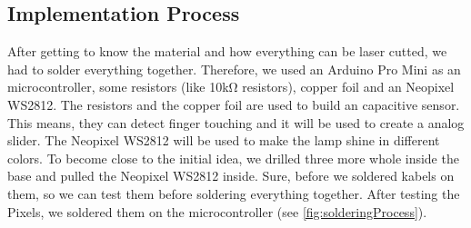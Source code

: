 \documentclass[doc.tex]{subfiles}
\begin{document}
    \subsection{Implementation Process}
        \begin{flushleft}
            After getting to know the material and how everything can be laser cutted, we had to 
            solder everything together. Therefore, we used an Arduino Pro Mini \cite{arduinoProMini} 
            as an microcontroller, some resistors (like 10k\si{\ohm} resistors), copper foil and an Neopixel WS2812. \newline
            The resistors and the copper foil are used to build an capacitive sensor. \cite{Badger2019} 
            This means, they can detect finger touching and it will be used to create a analog slider.
            The Neopixel WS2812 will be used to make the lamp shine in different colors. \cite{Burgess2019} 
            \newline 
            \noindent
            To become close to the initial idea, we drilled three more whole inside the base and 
            pulled the Neopixel WS2812 inside. Sure, before we soldered kabels on them, so we can 
            test them before soldering everything together. After testing the Pixels, we soldered 
            them on the microcontroller (see \ref{fig:solderingProcess}).
        \end{flushleft}
\end{document}
